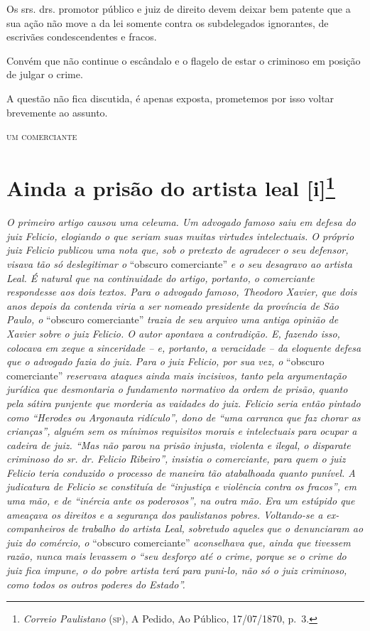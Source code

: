 Os srs. drs. promotor público e juiz de direito devem deixar bem patente
que a sua ação não move a da lei somente contra os subdelegados
ignorantes, de escrivães condescendentes e fracos.

Convém que não continue o escândalo e o flagelo de estar o criminoso em
posição de julgar o crime.

A questão não fica discutida, é apenas exposta, prometemos por isso
voltar brevemente ao assunto.

\begin{flushright}
\textsc{um comerciante}
\end{flushright}

\chapter{Ainda a prisão do artista leal {[}i{]}\footnote{\emph{Correio Paulistano} (\textsc{sp}), A Pedido, Ao Público,
  17/07/1870, p.~3.}} %

\begin{didascalia}
\emph{O primeiro artigo causou uma celeuma. Um advogado famoso saiu em
defesa do juiz Felicio, elogiando o que seriam suas muitas virtudes
intelectuais. O próprio juiz Felicio publicou uma nota que, sob o
pretexto de agradecer o seu defensor, visava tão só deslegitimar o}
``obscuro comerciante'' \emph{e o seu desagravo ao artista Leal. É natural
que na continuidade do artigo, portanto, o comerciante respondesse aos
dois textos. Para o advogado famoso, Theodoro Xavier, que dois anos
depois da contenda viria a ser nomeado presidente da província de São
Paulo, o} ``obscuro comerciante'' \emph{trazia de seu arquivo uma antiga
opinião de Xavier sobre o juiz Felicio. O autor apontava a contradição.
E, fazendo isso, colocava em xeque a sinceridade -- e, portanto, a
veracidade -- da eloquente defesa que o advogado fazia do juiz. Para o
juiz Felicio, por sua vez, o} ``obscuro comerciante'' \emph{reservava
ataques ainda mais incisivos, tanto pela argumentação jurídica que
desmontaria o fundamento normativo da ordem de prisão, quanto pela
sátira punjente que morderia as vaidades do juiz. Felicio seria então
pintado como ``Herodes ou Argonauta ridículo'', dono de ``uma carranca que
faz chorar as crianças'', alguém sem os mínimos requisitos morais e
intelectuais para ocupar a cadeira de juiz. ``Mas não parou na prisão
injusta, violenta e ilegal, o disparate criminoso do sr. dr. Felicio
Ribeiro'', insistia o comerciante, para quem o juiz Felicio teria
conduzido o processo de maneira tão atabalhoada quanto punível. A
judicatura de Felicio se constituía de ``injustiça e violência contra os
fracos'', em uma mão, e de ``inércia ante os poderosos'', na outra mão. Era
um estúpido que ameaçava os direitos e a segurança dos paulistanos
pobres. Voltando-se a ex-companheiros de trabalho do artista Leal,
sobretudo aqueles que o denunciaram ao juiz do comércio, o} ``obscuro
comerciante'' \emph{aconselhava que, ainda que tivessem razão, nunca mais
levassem o ``seu desforço até o crime, porque se o crime do juiz fica
impune, o do pobre artista terá para puni-lo, não só o juiz criminoso,
como todos os outros poderes do Estado''.}
\end{didascalia}


